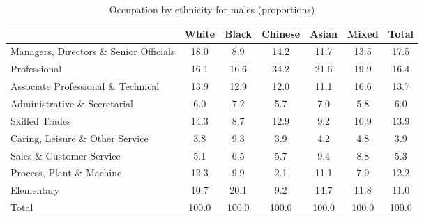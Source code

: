 \begin{table}[htbp]\centering
\def\sym#1{\ifmmode^{#1}\else\(^{#1}\)\fi}
\caption{Occupation by ethnicity for males (proportions)}
\begin{tabular}{l*{6}{c}}
\hline\hline
          &    White&    Black&  Chinese&    Asian&    Mixed&    Total\\
\hline
Managers, Directors \& Senior Officials         &     18.0&      8.9&     14.2&     11.7&     13.5&     17.5\\
Professional         &     16.1&     16.6&     34.2&     21.6&     19.9&     16.4\\
Associate Professional \& Technical         &     13.9&     12.9&     12.0&     11.1&     16.6&     13.7\\
Administrative \& Secretarial         &      6.0&      7.2&      5.7&      7.0&      5.8&      6.0\\
Skilled Trades         &     14.3&      8.7&     12.9&      9.2&     10.9&     13.9\\
Caring, Leisure \& Other Service         &      3.8&      9.3&      3.9&      4.2&      4.8&      3.9\\
Sales \& Customer Service         &      5.1&      6.5&      5.7&      9.4&      8.8&      5.3\\
Process, Plant \& Machine         &     12.3&      9.9&      2.1&     11.1&      7.9&     12.2\\
Elementary         &     10.7&     20.1&      9.2&     14.7&     11.8&     11.0\\
Total     &    100.0&    100.0&    100.0&    100.0&    100.0&    100.0\\
\hline\hline
\end{tabular}
\label{tab:occup_male}
\end{table}
